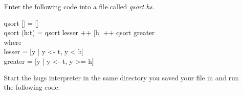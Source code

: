 \documentclass[11pt]{article}
\begin{document}


Enter the following code into a file called {\it{qsort.hs}}.

\begin{program*}
\> qsort [] = []                                       \\
\> qsort (h:t) = qsort lesser ++ [h] ++ qsort greater                                       \\
\>   where                                       \\
\>         lesser = [y | y <- t, y < h]                                       \\
\>         greater = [y | y <- t, y >= h]                                       \\
\end{program*}


Start the hugs interpreter in the same directory you saved your file in and run the following code.
\end{document}
